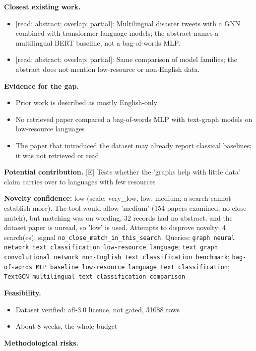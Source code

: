 \documentclass[11pt,a4paper]{article}
\begin{document}
\textbf{Closest existing work.}
\begin{itemize}
\item \cite{ghosh2022} [read: abstract; overlap: partial]: Multilingual disaster tweets with a GNN combined with transformer language models; the abstract names a multilingual BERT baseline, not a bag-of-words MLP.
\item \cite{galke2022} [read: abstract; overlap: partial]: Same comparison of model families; the abstract does not mention low-resource or non-English data.
\end{itemize}

\textbf{Evidence for the gap.}
\begin{itemize}
\item [V] Prior work is described as mostly English-only \cite{ghosh2022}
\item [V] No retrieved paper compared a bag-of-words MLP with text-graph models on low-resource languages
\item [S] The paper that introduced the dataset may already report classical baselines; it was not retrieved or read
\end{itemize}

\textbf{Potential contribution.} [E] Tests whether the 'graphs help with little data' claim carries over to languages with few resources

\textbf{Novelty confidence:} low (scale: very\_low, low, medium; a search cannot establish more). The tool would allow 'medium' (154 papers examined, no close match), but matching was on wording, 32 records had no abstract, and the dataset paper is unread, so 'low' is used.
Attempts to disprove novelty: 4 search(es); signal \texttt{no\_close\_match\_in\_this\_search}. Queries: \texttt{graph neural network text classification low-resource language}; \texttt{text graph convolutional network non-English text classification benchmark}; \texttt{bag-of-words MLP baseline low-resource language text classification}; \texttt{TextGCN multilingual text classification comparison}

\textbf{Feasibility.}
\begin{itemize}
\item [V] Dataset verified: afl-3.0 licence, not gated, 31088 rows
\item [E] About 8 weeks, the whole budget
\end{itemize}

\textbf{Methodological risks.}
\end{document}
